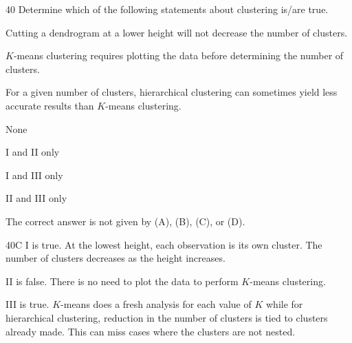 \begin{question}{40}
Determine which of the following statements about clustering is/are true.
\begin{statements}
\item Cutting a dendrogram at a lower height will not decrease the number of clusters.
\item $K$-means clustering requires plotting the data before determining the number of clusters.
\item For a given number of clusters, hierarchical clustering can sometimes yield less accurate results than $K$-means clustering.
\end{statements}

\begin{choices}
\item None
\item I and II only
\item I and III only
\item II and III only
\item The correct answer is not given by (A), (B), (C), or (D).
\end{choices}
\end{question}
\begin{solution}{40}{C}
I is true. At the lowest height, each observation is its own cluster. The number of clusters decreases as the height increases.

II is false. There is no need to plot the data to perform $K$-means clustering.

III is true. $K$-means does a fresh analysis for each value of $K$ while for hierarchical clustering, reduction in the number of clusters is tied to clusters already made. This can miss cases where the clusters are not nested.
\end{solution}

